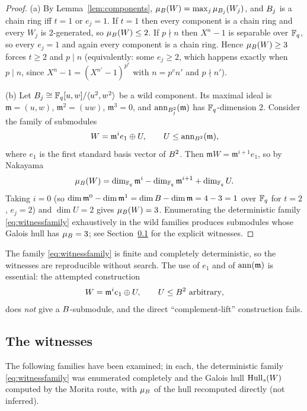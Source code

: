 \begin{proof}
(a) By Lemma~\ref{lem:components}, $\mu_{B}(W)=\max_j\mu_{B_j}(W_j)$, and
$B_j$ is a chain ring iff $t=1$ or $e_j=1$. If $t=1$ then every component is a
chain ring and every $W_j$ is $2$-generated, so $\mu_{B}(W)\le2$. If
$p\nmid n$ then $X^n-1$ is separable over $\mathbb F_q$, so every $e_j=1$ and again
every component is a chain ring. Hence $\mu_{B}(W)\ge3$ forces $t\ge2$ and
$p\mid n$ (equivalently: some $e_j\ge2$, which happens exactly when $p\mid n$,
since $X^n-1=(X^{n'}-1)^{p^v}$ with $n=p^vn'$ and $p\nmid n'$).

(b) Let $B_j\cong\mathbb F_q[u,w]/\langle u^2,w^2\rangle$ be a wild component. Its
maximal ideal is $\mathfrak m=(u,w)$, $\mathfrak m^2=(uw)$,
$\mathfrak m^3=0$, and $\operatorname{ann}_{B_j^2}(\mathfrak m)$ has $\mathbb F_q$-dimension $2$.
Consider the family of submodules
\begin{equation}\label{eq:witnessfamily}
  W=\mathfrak m^ie_1\oplus U,\qquad U\le\operatorname{ann}_{B^2}(\mathfrak m),
\end{equation}
where $e_1$ is the first standard basis vector of $B^2$. Then
$\mathfrak mW=\mathfrak m^{i+1}e_1$, so by Nakayama
\[
  \mu_{B}(W)=\dim_{\mathbb F_q}\mathfrak m^i-\dim_{\mathbb F_q}\mathfrak m^{i+1}
  +\dim_{\mathbb F_q}U .
\]
Taking $i=0$ (so $\dim\mathfrak m^0-\dim\mathfrak m^1=\dim B-\dim\mathfrak m
=4-3=1$ over $\mathbb F_q$ for $t=2$, $e_j=2$) and $\dim U=2$ gives
$\mu_{B}(W)=3$. Enumerating the deterministic family \eqref{eq:witnessfamily}
exhaustively in the wild families produces submodules whose Galois hull has
$\mu_{B}=3$; see Section~\ref{subsec:witnesses} for the explicit witnesses.
\end{proof}

\begin{remark}
The family \eqref{eq:witnessfamily} is finite and completely deterministic, so
the witnesses are reproducible without search. The use of $e_1$ and of
$\operatorname{ann}(\mathfrak m)$ is essential: the attempted construction
\[
  W=\mathfrak m^ie_1\oplus U,\qquad U\le\Bq^2\ \text{arbitrary},
\]
does \emph{not} give a $B$-submodule, and the direct
``complement-lift'' construction fails.
\end{remark}

\subsection{The witnesses}\label{subsec:witnesses}

The following families have been examined; in each, the deterministic family
\eqref{eq:witnessfamily} was enumerated completely and the Galois hull
$\operatorname{Hull}_s(W)$ computed by the Morita route, with $\mu_{B}$ of the hull
recomputed directly (not inferred).

